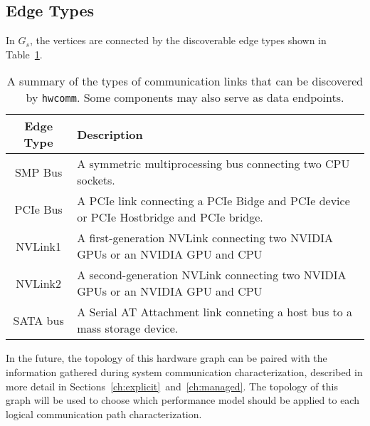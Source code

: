 \subsection{Edge Types}
\label{sec:system-edges}

In $G_s$, the vertices are connected by the discoverable edge types shown in Table~\ref{tab:topology-edges}.

\begin{table}[]
    \centering
    \caption[Discoverable edge types]{
        A summary of the types of communication links that can be discovered by \texttt{hwcomm}.
        Some components may also serve as data endpoints.
    }
    \label{tab:topology-edges}
    \begin{tabularx}{\linewidth}{ |c | >{\centering\arraybackslash}X |}
    \hline
    \textbf{Edge Type} & \textbf{Description} \\ \hline
    SMP Bus            & A symmetric multiprocessing bus connecting two CPU sockets. \\ \hline
    PCIe Bus           & A PCIe link connecting a PCIe Bidge and PCIe device or PCIe Hostbridge and PCIe bridge. \\ \hline
    NVLink1            & A first-generation NVLink connecting two NVIDIA GPUs or an NVIDIA GPU and CPU \\ \hline
    NVLink2            & A second-generation NVLink connecting two NVIDIA GPUs or an NVIDIA GPU and CPU \\ \hline
    SATA bus           & A Serial AT Attachment link conneting a host bus to a mass storage device. \\ \hline
    \end{tabularx}
\end{table}

In the future, the topology of this hardware graph can be paired with the information gathered during system communication characterization, described in more detail in Sections~\ref{ch:explicit}~and~\ref{ch:managed}.
The topology of this graph will be used to choose which performance model should be applied to each logical communication path characterization.